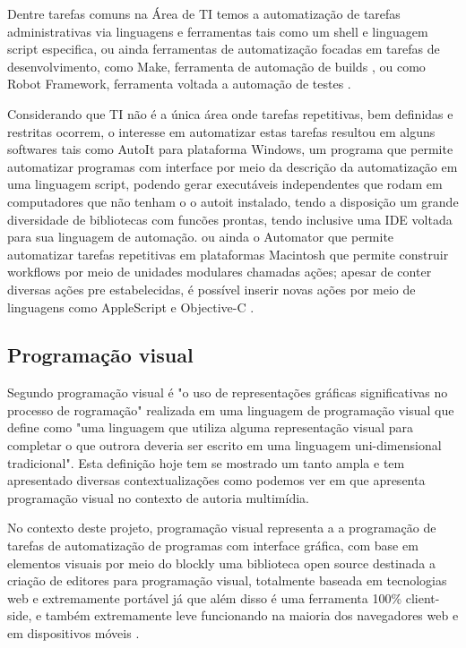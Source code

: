 \documentclass[12pt]{article}
\begin{document}
	Dentre tarefas comuns na Área de TI temos a automatização de tarefas administrativas via linguagens e ferramentas tais como um shell e linguagem script especifica, ou ainda ferramentas de automatização focadas em tarefas de desenvolvimento, como Make, ferramenta de automação de builds , ou como Robot Framework, ferramenta voltada a automação de testes \cite{shell,make,robotFW}.

	Considerando que TI não é a única área onde tarefas repetitivas, bem definidas e restritas ocorrem, o interesse em automatizar estas tarefas resultou em alguns softwares tais como AutoIt para plataforma Windows, um programa que permite automatizar programas com interface por meio da descrição da automatização em uma linguagem script, podendo gerar executáveis independentes que rodam em computadores que não tenham o o autoit instalado, tendo a disposição um grande diversidade de bibliotecas com funcões prontas, tendo inclusive uma IDE voltada para sua linguagem de automação. ou ainda o Automator que permite automatizar tarefas repetitivas em plataformas Macintosh que permite construir workflows por meio de unidades modulares chamadas ações; apesar de conter diversas ações pre estabelecidas, é possível inserir novas ações por meio de linguagens como AppleScript e Objective-C \cite{autoit,automator}.
	

	\subsection{Programação visual}
	
	Segundo \citeauthor{visualProgram}\cite{visualProgram} programação visual é "o uso de representações gráficas significativas no processo de rogramação" realizada em uma linguagem de programação visual que \citeauthor{visualProgram} define como "uma linguagem que utiliza alguma representação visual para completar o que outrora deveria ser escrito em uma linguagem uni-dimensional tradicional". Esta definição hoje tem se mostrado um tanto ampla e tem apresentado diversas contextualizações como podemos ver em \cite{visualProgAuth} que apresenta programação visual no contexto de autoria multimídia.
	
	No contexto deste projeto, programação visual representa a a programação de tarefas de automatização de programas com interface gráfica, com base em elementos visuais por meio do blockly uma biblioteca open source destinada a criação de editores para programação visual, totalmente baseada em tecnologias web e extremamente portável já que além disso é uma ferramenta 100\% client-side, e também extremamente leve funcionando na maioria dos navegadores web e em dispositivos móveis \cite{Blockly}.
	
\end{document}
